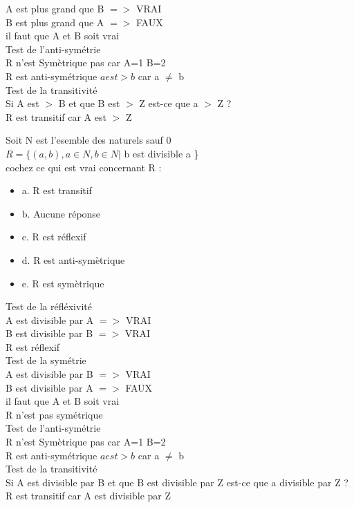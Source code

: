 A est plus grand que B $=>$ VRAI \\
B est plus grand que A $=>$ FAUX \\
il faut que A et B soit vrai \\

Test de l'anti-symétrie \\

R n'est Symètrique pas car A=1 B=2 \\
R est anti-symétrique $a est > b$ car a $\neq$ b\\

Test de la transitivité \\

Si A est $>$ B et que B est $>$ Z est-ce que a $>$ Z ? \\
R est transitif car A est $>$ Z \\


\vspace{10mm} %

Soit N est l’esemble des naturels sauf 0 \\
$R=\{(a,b), a ∈ N, b ∈ N |$ b est divisible a \} \\

cochez ce qui est vrai concernant R : \\

\begin{itemize}[label=$\square$]
\item {a. R est transitif}
\item {b. Aucune réponse}
\item {c. R est réflexif}
\item {d. R est anti-symètrique}
\item {e. R est symètrique}
\end{itemize}

Test de la réfléxivité \\

A est divisible par A $=>$ VRAI \\
B est divisible par B $=>$ VRAI \\
R est réflexif \\

Test de la symétrie \\

A est divisible par B $=>$ VRAI \\
B est divisible par A $=>$ FAUX \\
il faut que A et B soit vrai \\
R n'est pas symétrique \\

Test de l'anti-symétrie \\

R n'est Symètrique pas car A=1 B=2 \\
R est anti-symétrique $a est > b$ car a $\neq$ b\\

Test de la transitivité \\

Si A est divisible par B et que B est divisible par Z est-ce que a divisible par Z ? \\
R est transitif car A est divisible par Z \\
